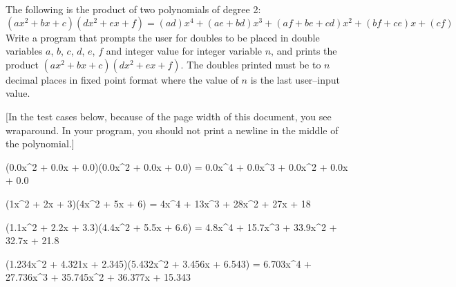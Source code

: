 The following is the product of two polynomials of degree 2:
\[
(ax^2 + bx + c)(dx^2 + ex + f) = 
(ad)x^4 + (ae + bd)x^3 + (af + be + cd)x^2 + (bf + ce)x + (cf)
\]
Write a program that prompts the user 
for doubles to be placed in double variables 
$a$, $b$, $c$, $d$, $e$, $f$ and
integer value for integer variable $n$, 
and prints the product 
$(ax^2 + bx + c)(dx^2 + ex + f)$. 
The doubles
printed must be to $n$ decimal places in fixed point format where the value of
 $n$ is the last user--input
value.

[In the test cases below, because of the page width of this document, you see wraparound. In your
program, you should not print a newline in the middle of the polynomial.]

\resett
\nextt
\begin{console}[commandchars=\\\{\}]
(0.0x^2 + 0.0x + 0.0)(0.0x^2 + 0.0x + 0.0) = 0.0x^4 + 0.0x^3 + 0.0x^2 + 
0.0x + 0.0
\end{console}

\nextt
\begin{console}[commandchars=\\\{\}]
(1x^2 + 2x + 3)(4x^2 + 5x + 6) = 4x^4 + 13x^3 + 28x^2 + 27x + 18
\end{console}

\nextt
\begin{console}[commandchars=\\\{\}]
(1.1x^2 + 2.2x + 3.3)(4.4x^2 + 5.5x + 6.6) = 4.8x^4 + 15.7x^3 + 33.9x^2 +
32.7x + 21.8
\end{console}

\nextt
\begin{console}[commandchars=\\\{\}]
(1.234x^2 + 4.321x + 2.345)(5.432x^2 + 3.456x + 6.543) = 6.703x^4 +
27.736x^3 + 35.745x^2 + 36.377x + 15.343
\end{console}
